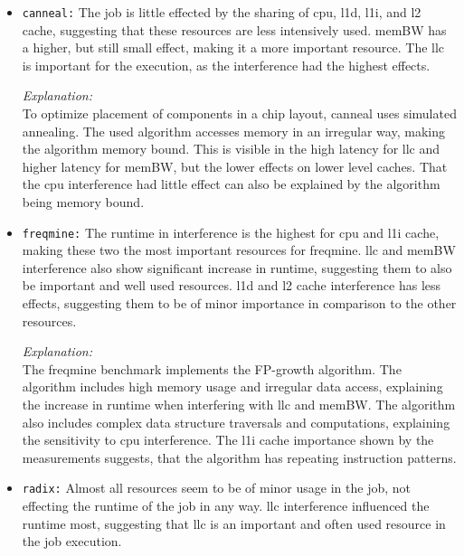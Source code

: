 \begin{enumerate}
\begin{enumerate}
\begin{itemize}
            \item \texttt{canneal:} %
            The job is little effected by the sharing of cpu, l1d, l1i, and l2 cache, suggesting that these resources are less intensively used. memBW has a higher, but still small effect, making it a more important resource. The llc is important for the execution, as the interference had the highest effects.
            
            \textit{Explanation:} %
            \\ To optimize placement of components in a chip layout, canneal uses simulated annealing. The used algorithm accesses memory in an irregular way, making the algorithm memory bound. This is visible in the high latency for llc and higher latency for memBW, but the lower effects on lower level caches. That the cpu interference had little effect can also be explained by the algorithm being memory bound.

            \item \texttt{freqmine:} %
            The runtime in interference is the highest for cpu and l1i cache, making these two the most important resources for freqmine. llc and memBW interference also show significant increase in runtime, suggesting them to also be important and well used resources. l1d and l2 cache interference has less effects, suggesting them to be of minor importance in comparison to the other resources.
            
            \textit{Explanation:} %
            \\ The freqmine benchmark implements the FP-growth algorithm. The algorithm includes high memory usage and irregular data access, explaining the increase in runtime when interfering with llc and memBW. The algorithm also includes complex data structure traversals and computations, explaining the sensitivity to cpu interference. The l1i cache importance shown by the measurements suggests, that the algorithm has repeating instruction patterns.

            \item \texttt{radix:} %
            Almost all resources seem to be of minor usage in the job, not effecting the runtime of the job in any way. llc interference influenced the runtime most, suggesting that llc is an important and often used resource in the job execution. 
            

\end{itemize}
\end{enumerate}
\end{enumerate}
